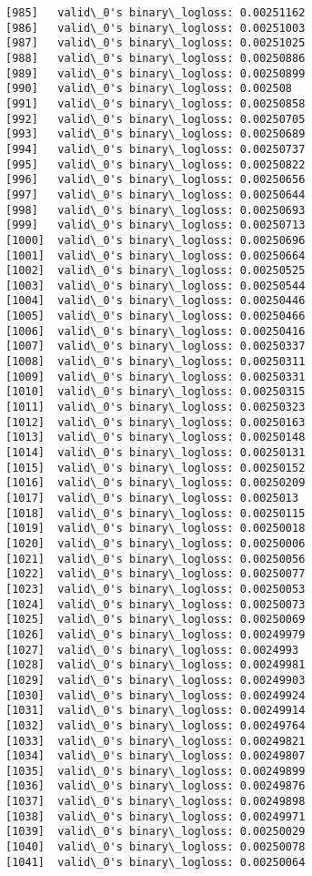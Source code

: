 \documentclass[11pt]{article}
\begin{document}
\begin{Verbatim}[commandchars=\\\{\}]
[985]	valid\_0's binary\_logloss: 0.00251162
[986]	valid\_0's binary\_logloss: 0.00251003
[987]	valid\_0's binary\_logloss: 0.00251025
[988]	valid\_0's binary\_logloss: 0.00250886
[989]	valid\_0's binary\_logloss: 0.00250899
[990]	valid\_0's binary\_logloss: 0.002508
[991]	valid\_0's binary\_logloss: 0.00250858
[992]	valid\_0's binary\_logloss: 0.00250705
[993]	valid\_0's binary\_logloss: 0.00250689
[994]	valid\_0's binary\_logloss: 0.00250737
[995]	valid\_0's binary\_logloss: 0.00250822
[996]	valid\_0's binary\_logloss: 0.00250656
[997]	valid\_0's binary\_logloss: 0.00250644
[998]	valid\_0's binary\_logloss: 0.00250693
[999]	valid\_0's binary\_logloss: 0.00250713
[1000]	valid\_0's binary\_logloss: 0.00250696
[1001]	valid\_0's binary\_logloss: 0.00250664
[1002]	valid\_0's binary\_logloss: 0.00250525
[1003]	valid\_0's binary\_logloss: 0.00250544
[1004]	valid\_0's binary\_logloss: 0.00250446
[1005]	valid\_0's binary\_logloss: 0.00250466
[1006]	valid\_0's binary\_logloss: 0.00250416
[1007]	valid\_0's binary\_logloss: 0.00250337
[1008]	valid\_0's binary\_logloss: 0.00250311
[1009]	valid\_0's binary\_logloss: 0.00250331
[1010]	valid\_0's binary\_logloss: 0.00250315
[1011]	valid\_0's binary\_logloss: 0.00250323
[1012]	valid\_0's binary\_logloss: 0.00250163
[1013]	valid\_0's binary\_logloss: 0.00250148
[1014]	valid\_0's binary\_logloss: 0.00250131
[1015]	valid\_0's binary\_logloss: 0.00250152
[1016]	valid\_0's binary\_logloss: 0.00250209
[1017]	valid\_0's binary\_logloss: 0.0025013
[1018]	valid\_0's binary\_logloss: 0.00250115
[1019]	valid\_0's binary\_logloss: 0.00250018
[1020]	valid\_0's binary\_logloss: 0.00250006
[1021]	valid\_0's binary\_logloss: 0.00250056
[1022]	valid\_0's binary\_logloss: 0.00250077
[1023]	valid\_0's binary\_logloss: 0.00250053
[1024]	valid\_0's binary\_logloss: 0.00250073
[1025]	valid\_0's binary\_logloss: 0.00250069
[1026]	valid\_0's binary\_logloss: 0.00249979
[1027]	valid\_0's binary\_logloss: 0.0024993
[1028]	valid\_0's binary\_logloss: 0.00249981
[1029]	valid\_0's binary\_logloss: 0.00249903
[1030]	valid\_0's binary\_logloss: 0.00249924
[1031]	valid\_0's binary\_logloss: 0.00249914
[1032]	valid\_0's binary\_logloss: 0.00249764
[1033]	valid\_0's binary\_logloss: 0.00249821
[1034]	valid\_0's binary\_logloss: 0.00249807
[1035]	valid\_0's binary\_logloss: 0.00249899
[1036]	valid\_0's binary\_logloss: 0.00249876
[1037]	valid\_0's binary\_logloss: 0.00249898
[1038]	valid\_0's binary\_logloss: 0.00249971
[1039]	valid\_0's binary\_logloss: 0.00250029
[1040]	valid\_0's binary\_logloss: 0.00250078
[1041]	valid\_0's binary\_logloss: 0.00250064

\end{Verbatim}
\end{document}
